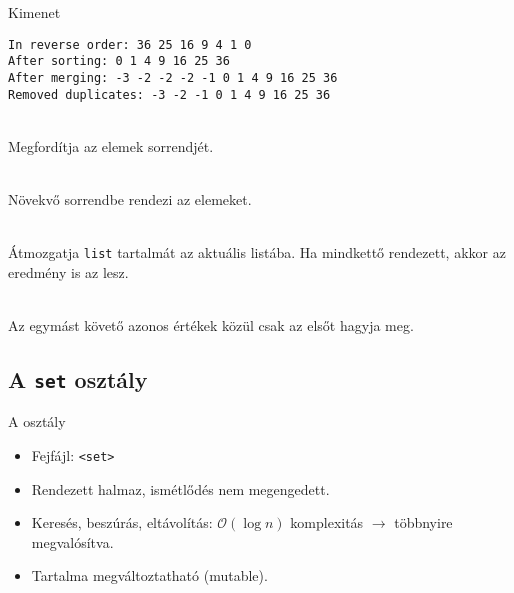 \begin{frame}[fragile]
    \begin{block}{Kimenet}
        \small
        \vspace{-.4cm}
        \begin{verbatim}
In reverse order: 36 25 16 9 4 1 0 
After sorting: 0 1 4 9 16 25 36 
After merging: -3 -2 -2 -2 -1 0 1 4 9 16 25 36 
Removed duplicates: -3 -2 -1 0 1 4 9 16 25 36
\end{verbatim}
        \vspace{-.3cm}
    \end{block}
    \vfill
    \begin{description}[m]
        \small
        \item[\hiv{\href{https://en.cppreference.com/w/cpp/container/list/reverse}{\texttt{reverse()}}}] \hfill \\ Megfordítja az elemek sorrendjét.
        \item[\hiv{\href{https://en.cppreference.com/w/cpp/container/list/sort}{\texttt{sort()}}}] \hfill \\ Növekvő sorrendbe rendezi az elemeket.
        \item[\hiv{\href{https://en.cppreference.com/w/cpp/container/list/merge}{\texttt{merge(list)}}}] \hfill \\ Átmozgatja \texttt{list} tartalmát az aktuális listába. Ha mindkettő rendezett, akkor az eredmény is az lesz.
        \item[\hiv{\href{https://en.cppreference.com/w/cpp/container/list/unique}{\texttt{unique()}}}] \hfill \\ Az egymást követő azonos értékek közül csak az elsőt hagyja meg.
    \end{description}
\end{frame}

\subsection{A \texttt{set} osztály}

\begin{frame}
    A  osztály
    \begin{itemize}
        \item Fejfájl: \texttt{<set>}
        \item Rendezett halmaz, ismétlődés nem megengedett.
        \item Keresés, beszúrás, eltávolítás: $\mathcal{O}(\log{}n)$ komplexitás $\to$ többnyire  megvalósítva.
        \item Tartalma megváltoztatható (mutable).
    \end{itemize}
\end{frame}


